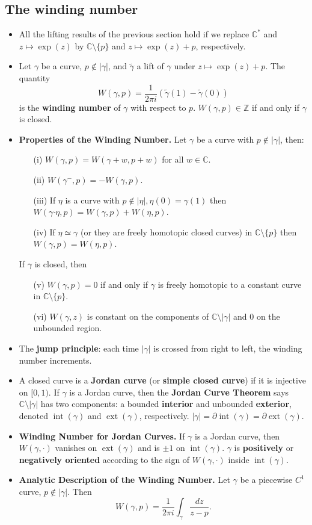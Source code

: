 \documentclass{article}
\DeclareMathOperator{\interior}{int}
\DeclareMathOperator{\exterior}{ext}
\newenvironment{topic}[1]{%
{\subsection{#1}}%
\begin{itemize}%
}{%
\end{itemize}%
}
\newcommand{\theorem}[1]{\item {\bf #1.}}
\newcommand{\term}[1]{{\bf #1}}
\newcommand{\remark}{\item}
\newcommand{\curveproduct}{\boldsymbol{\cdot}}
\begin{document}
\begin{topic}{The winding number}

\remark All the lifting results of the previous section hold if we replace $\mathbb{C}^\ast$ and $z \mapsto \exp(z)$ by $\mathbb{C} \setminus \{p\}$ and $z \mapsto \exp(z) + p$, respectively.

\remark Let $\gamma$ be a curve, $p \not\in |\gamma|$, and $\tilde{\gamma}$ a lift of $\gamma$ under $z \mapsto \exp(z) + p$. The quantity $$W(\gamma, p) = \dfrac{1}{2 \pi i}\left(\tilde{\gamma}(1) - \tilde{\gamma}(0)\right)$$ is the \term{winding number} of $\gamma$ with respect to $p$. $W(\gamma, p) \in \mathbb{Z}$ if and only if $\gamma$ is closed.

\theorem{Properties of the Winding Number} Let $\gamma$ be a curve with $p \not\in |\gamma|$, then:
\begin{enumerate}
\item[(i)] $W(\gamma, p) = W(\gamma + w, p + w)$ for all $w \in \mathbb{C}$.
\item[(ii)] $W(\gamma^-, p) = -W(\gamma, p)$.
\item[(iii)] If $\eta$ is a curve with $p \not\in |\eta|, \eta(0) = \gamma(1)$ then $W(\gamma \curveproduct \eta, p) = W(\gamma, p) + W(\eta, p)$.
\item[(iv)] If $\eta \simeq \gamma$ (or they are freely homotopic closed curves) in $\mathbb{C} \setminus \{ p \}$ then $W(\gamma, p) = W(\eta, p)$.
\end{enumerate}
If $\gamma$ is closed, then
\begin{enumerate}
\item[(v)] $W(\gamma, p) = 0$ if and only if $\gamma$ is freely homotopic to a constant curve in $\mathbb{C} \setminus \{ p \}$.
\item[(vi)] $W(\gamma, z)$ is constant on the components of $\mathbb{C} \setminus |\gamma|$ and $0$ on the unbounded region.
\end{enumerate}

\remark The \term{jump principle}: each time $|\gamma|$ is crossed from right to left, the winding number increments.

\remark A closed curve is a \term{Jordan curve} (or \term{simple closed curve}) if it is injective on $[0, 1)$. If $\gamma$ is a Jordan curve, then the \term{Jordan Curve Theorem} says $\mathbb{C} \setminus |\gamma|$ has two components: a bounded \term{interior} and unbounded \term{exterior}, denoted $\interior(\gamma)$ and $\exterior(\gamma)$, respectively. $|\gamma| = \partial \interior(\gamma) = \partial \exterior(\gamma)$.

\theorem{Winding Number for Jordan Curves} If $\gamma$ is a Jordan curve, then $W(\gamma, \cdot)$ vanishes on $\exterior(\gamma)$ and is $\pm 1$ on $\interior(\gamma)$. $\gamma$ is \term{positively} or \term{negatively oriented} according to the sign of $W(\gamma, \cdot)$ inside $\interior(\gamma)$.

\theorem{Analytic Description of the Winding Number} Let $\gamma$ be a piecewise $C^1$ curve, $p \not\in |\gamma|$. Then $$W(\gamma, p) = \dfrac{1}{2 \pi i} \int_{\gamma} \dfrac{dz}{z - p}.$$

\end{topic}
\end{document}
